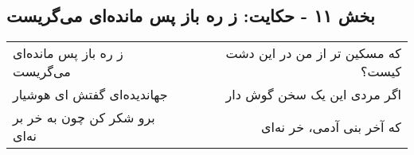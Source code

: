 \begin{center}
\section*{بخش ۱۱ - حکایت: ز ره باز پس مانده‌ای می‌گریست}
\label{sec:011}
\begin{longtable}{l p{0.5cm} r}
ز ره باز پس مانده‌ای می‌گریست
&&
که مسکین تر از من در این دشت کیست؟
\\
جهاندیده‌ای گفتش ای هوشیار
&&
اگر مردی این یک سخن گوش دار
\\
برو شکر کن چون به خر بر نه‌ای
&&
که آخر بنی آدمی، خر نه‌ای
\\
\end{longtable}
\end{center}
